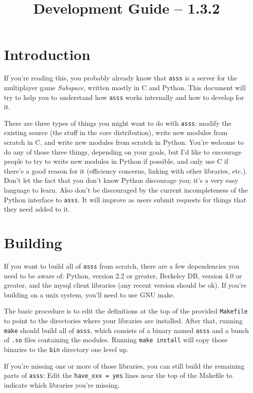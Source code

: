 \documentclass{article}
\title{\asss{} Development Guide -- 1.3.2}
\newcommand{\asss}{\texttt{asss}}
\begin{document}
\maketitle

\section{Introduction}

If you're reading this, you probably already know that \asss{} is a
server for the multiplayer game \emph{Subspace}, written mostly in C and
Python. This document will try to help you to understand how \asss{}
works internally and how to develop for it.

There are three types of things you might want to do with \asss{}:
modify the existing source (the stuff in the core distribution), write
new modules from scratch in C, and write new modules from scratch in
Python. You're welcome to do any of those three things, depending on
your goals, but I'd like to encourage people to try to write new modules
in Python if possible, and only use C if there's a good reason for it
(efficiency concerns, linking with other libraries, etc.). Don't let the
fact that you don't know Python discourage you; it's a very easy
language to learn. Also don't be discouraged by the current
incompleteness of the Python interface to \asss{}. It will improve as
users submit requests for things that they need added to it.


\section{Building}

If you want to build all of \asss{} from scratch, there are a few
dependencies you need to be aware of: Python, version 2.2 or greater,
Berkeley DB, version 4.0 or greater, and the mysql client libraries (any
recent version should be ok). If you're building on a unix system,
you'll need to use GNU make.

The basic procedure is to edit the definitions at the top of the
provided \verb/Makefile/ to point to the directories where your
libraries are installed. After that, running \verb/make/ should build
all of \asss{}, which consists of a binary named \verb/asss/ and a bunch
of \verb/.so/ files containing the modules. Running \verb/make install/
will copy those binaries to the \verb/bin/ directory one level up.

If you're missing one or more of those libraries, you can still build
the remaining parts of \asss{}: Edit the \verb/have_xxx = yes/ lines
near the top of the Makefile to indicate which libraries you're missing.
\end{document}
